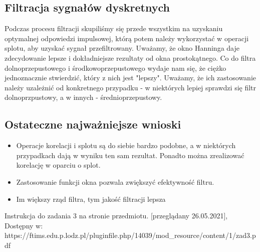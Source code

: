 \documentclass[12pt]{article}
\begin{document}
\subsection{Filtracja sygnałów dyskretnych}
Podczas procesu filtracji skupiliśmy się przede wszystkim na uzyskaniu optymalnej odpowiedzi impulsowej, którą potem należy wykorzystać w operacji splotu, aby uzyskać sygnał przefiltrowany. Uważamy, że okno Hanninga daje zdecydowanie lepsze i dokładniejsze rezultaty od okna prostokątnego. Co do filtra dolnoprzepustowego i środkowoprzepustowego wydaje nam się, że ciężko jednoznacznie stwierdzić, który z nich jest "lepszy". Uważamy, że ich zastosowanie należy uzależnić od konkretnego przypadku - w niektórych lepiej sprawdzi się filtr dolnoprzpustowy, a w innych - średnioprzepustowy.

\subsection{Ostateczne najważniejsze wnioski}
\begin{itemize}
    \item Operacje korelacji i splotu są do siebie bardzo podobne, a w niektórych przypadkach dają w wyniku ten sam rezultat. Ponadto można zrealizować korelację w oparciu o splot.
    \item Zastosowanie funkcji okna pozwala zwiększyć efektywność filtru.
    \item Im większy rząd filtra, tym jakość filtracji lepsza
\end{itemize}
\begin{thebibliography}{}
 Instrukcja do zadania 3 na stronie przedmiotu. [przeglądany 26.05.2021], Dostępny w: https://ftims.edu.p.lodz.pl/pluginfile.php/14039/mod\_resource/content/1/zad3.pdf


\end{thebibliography}
\end{document}
